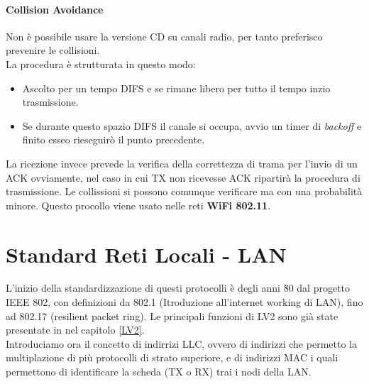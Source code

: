\documentclass[12pt]{article}
\begin{document}
\paragraph{Collision Avoidance}
Non è possibile usare la versione CD su canali radio, per tanto preferisco prevenire le collisioni.\\
La procedura è strutturata in questo modo:
\begin{itemize}
  \item Ascolto per un tempo DIFS e se rimane libero per tutto il tempo inzio trasmissione.
  \item Se durante questo spazio DIFS il canale si occupa, avvio un timer di \textit{backoff} e finito esseo rieseguirò il punto precedente.
\end{itemize}
La ricezione invece prevede la verifica della correttezza di trama per l'invio di un ACK ovviamente, nel caso in cui TX non ricevesse ACK ripartirà la procedura di trasmissione. Le collissioni si possono comunque verificare ma con una probabilità minore. Questo procollo viene usato nelle reti \textbf{WiFi 802.11}.

\section{Standard Reti Locali - LAN}
L'inizio della standardizzazione di questi protocolli è degli anni \`80 dal progetto IEEE 802, con definizioni da 802.1 (Itroduzione all'internet working di LAN), fino ad 802.17 (resilient packet ring). Le principali funzioni di LV2 sono già state presentate in nel capitolo \ref{LV2}.\\
Introduciamo ora il concetto di indirrizi LLC, ovvero di indirizzi che permetto la multiplazione di più protocolli di strato superiore, e di indirizzi MAC i quali permettono di identificare la scheda (TX o RX) trai i nodi della LAN.
\end{document}
